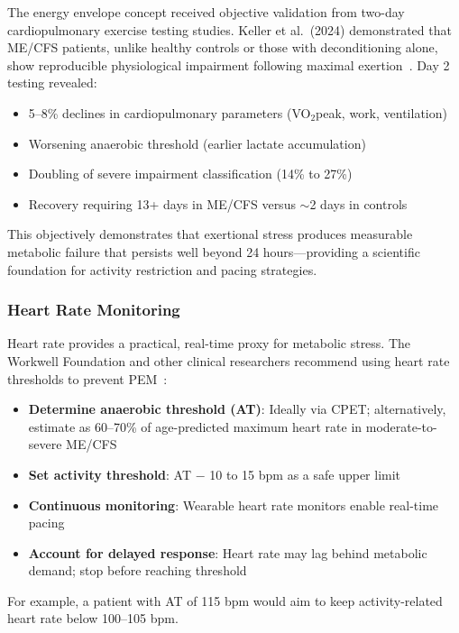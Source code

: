 The energy envelope concept received objective validation from two-day cardiopulmonary exercise testing studies. Keller et al.\ (2024) demonstrated that ME/CFS patients, unlike healthy controls or those with deconditioning alone, show reproducible physiological impairment following maximal exertion~\cite{keller2024cpet}. Day 2 testing revealed:

\begin{itemize}
    \item 5--8\% declines in cardiopulmonary parameters (VO$_2$peak, work, ventilation)
    \item Worsening anaerobic threshold (earlier lactate accumulation)
    \item Doubling of severe impairment classification (14\% to 27\%)
    \item Recovery requiring 13+ days in ME/CFS versus $\sim$2 days in controls
\end{itemize}

This objectively demonstrates that exertional stress produces measurable metabolic failure that persists well beyond 24 hours---providing a scientific foundation for activity restriction and pacing strategies.

\subsubsection{Heart Rate Monitoring}

Heart rate provides a practical, real-time proxy for metabolic stress. The Workwell Foundation and other clinical researchers recommend using heart rate thresholds to prevent PEM~\cite{keller2024cpet}:

\begin{itemize}
    \item \textbf{Determine anaerobic threshold (AT)}: Ideally via CPET; alternatively, estimate as 60--70\% of age-predicted maximum heart rate in moderate-to-severe ME/CFS
    \item \textbf{Set activity threshold}: AT $-$ 10 to 15 bpm as a safe upper limit
    \item \textbf{Continuous monitoring}: Wearable heart rate monitors enable real-time pacing
    \item \textbf{Account for delayed response}: Heart rate may lag behind metabolic demand; stop before reaching threshold
\end{itemize}

For example, a patient with AT of 115 bpm would aim to keep activity-related heart rate below 100--105 bpm.

